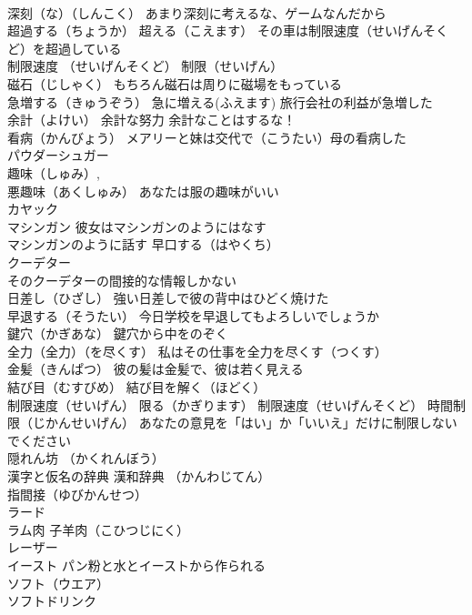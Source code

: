 \documentclass[8pt]{extreport}
\begin{document}
\begin{CJK}{UTF8}{min}
\\	深刻（な）（しんこく） あまり深刻に考えるな、ゲームなんだから
\\	超過する（ちょうか） 超える（こえます） その車は制限速度（せいげんそくど）を超過している
\\	制限速度 （せいげんそくど） 制限（せいげん）
\\	磁石（じしゃく） もちろん磁石は周りに磁場をもっている
\\	急増する（きゅうぞう） 急に増える(ふえます) 旅行会社の利益が急増した
\\	余計（よけい） 余計な努力 余計なことはするな！
\\	看病（かんびょう） メアリーと妹は交代で（こうたい）母の看病した
\\	パウダーシュガー
\\	趣味（しゅみ）, 
\\	悪趣味（あくしゅみ） あなたは服の趣味がいい
\\	カヤック
\\	マシンガン 彼女はマシンガンのようにはなす
\\	マシンガンのように話す 早口する（はやくち）
\\	クーデター 
\\	そのクーデターの間接的な情報しかない
\\	日差し（ひざし） 強い日差しで彼の背中はひどく焼けた
\\	早退する（そうたい） 今日学校を早退してもよろしいでしょうか
\\	鍵穴（かぎあな） 鍵穴から中をのぞく
\\	全力（全力）（を尽くす） 私はその仕事を全力を尽くす（つくす）
\\	金髪（きんぱつ） 彼の髪は金髪で、彼は若く見える
\\	結び目（むすびめ） 結び目を解く（ほどく）
\\	制限速度（せいげん） 限る（かぎります） 制限速度（せいげんそくど） 時間制限（じかんせいげん） あなたの意見を「はい」か「いいえ」だけに制限しないでください
\\	隠れん坊 （かくれんぼう）
\\	漢字と仮名の辞典	漢和辞典 （かんわじてん）
\\	指間接（ゆびかんせつ）
\\	ラード
\\	ラム肉 子羊肉（こひつじにく）
\\	レーザー
\\	イースト パン粉と水とイーストから作られる
\\	ソフト（ウエア）
\\	ソフトドリンク

\end{CJK}
\end{document}

